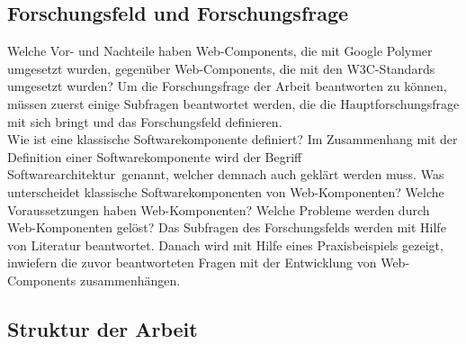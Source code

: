 
\subsection{Forschungsfeld und Forschungsfrage}
\label{sec:1_Forschungsfrage}
Welche Vor- und Nachteile haben Web-Components, die mit Google Polymer umgesetzt wurden, gegenüber Web-Components, die mit den W3C-Standards umgesetzt wurden?
Um die Forschungsfrage der Arbeit beantworten zu können, müssen zuerst einige Subfragen beantwortet werden, die die Hauptforschungsfrage mit sich bringt und das Forschungsfeld definieren.\\
Wie ist eine klassische Softwarekomponente definiert? Im Zusammenhang mit der Definition einer Softwarekomponente wird der Begriff \glqq Softwarearchitektur\grqq\ genannt, welcher demnach auch geklärt werden muss. Was unterscheidet klassische Softwarekomponenten von Web-Komponenten? Welche Voraussetzungen haben Web-Komponenten? Welche Probleme werden durch Web-Komponenten gelöst?
Das Subfragen des Forschungsfelds werden mit Hilfe von Literatur beantwortet. Danach wird mit Hilfe eines Praxisbeispiels gezeigt, inwiefern die zuvor beantworteten Fragen mit der Entwicklung von Web-Components zusammenhängen.


\subsection{Struktur der Arbeit}
\label{sec:1_Struktur}

